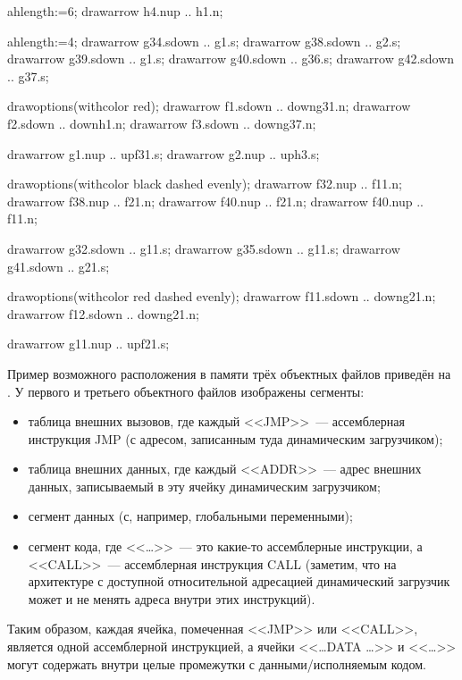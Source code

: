 \begin{empdef}[inmemory]
    ahlength:=6;
    drawarrow h4.n{up} .. h1.n;

    ahlength:=4;
    drawarrow g34.s{down} .. g1.s;
    drawarrow g38.s{down} .. g2.s;
    drawarrow g39.s{down} .. g1.s;
    drawarrow g40.s{down} .. g36.s;
    drawarrow g42.s{down} .. g37.s;

    drawoptions(withcolor red);
    drawarrow f1.s{down} .. {down}g31.n;
    drawarrow f2.s{down} .. {down}h1.n;
    drawarrow f3.s{down} .. {down}g37.n;

    drawarrow g1.n{up} .. {up}f31.s;
    drawarrow g2.n{up} .. {up}h3.s;

    drawoptions(withcolor black dashed evenly);
    drawarrow f32.n{up} .. f11.n;
    drawarrow f38.n{up} .. f21.n;
    drawarrow f40.n{up} .. f21.n;
    drawarrow f40.n{up} .. f11.n;
    
    drawarrow g32.s{down} .. g11.s;
    drawarrow g35.s{down} .. g11.s;
    drawarrow g41.s{down} .. g21.s;

    drawoptions(withcolor red dashed evenly);
    drawarrow f11.s{down} .. {down}g21.n;
    drawarrow f12.s{down} .. {down}g21.n;
    
    drawarrow g11.n{up} .. {up}f21.s;
\end{empdef}


Пример возможного расположения в памяти трёх объектных файлов приведён на .
У первого и третьего объектного файлов изображены сегменты:
\begin{itemize}
    \item таблица внешних вызовов, где каждый <<JMP>>~--- ассемблерная инструкция JMP (с адресом, записанным туда динамическим загрузчиком);
    \item таблица внешних данных, где каждый <<ADDR>>~--- адрес внешних данных, записываемый в эту ячейку динамическим загрузчиком;
    \item сегмент данных (с, например, глобальными переменными);
    \item сегмент кода, где <<\dots>>~--- это какие-то ассемблерные инструкции, а <<CALL>>~--- ассемблерная инструкция CALL (заметим, что на архитектуре с доступной относительной адресацией динамический загрузчик может и не менять адреса внутри этих инструкций).
\end{itemize}
Таким образом, каждая ячейка, помеченная <<JMP>> или <<CALL>>, является одной ассемблерной инструкцией, а ячейки <<\dots DATA \dots>> и <<\dots>> могут содержать внутри целые промежутки с данными/исполняемым кодом.

